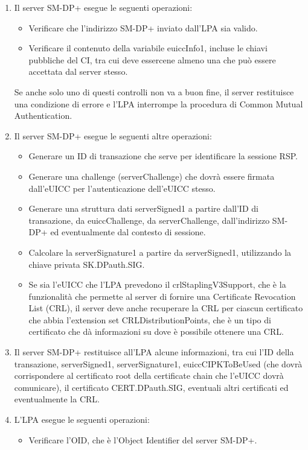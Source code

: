 \documentclass[10pt, twoside, openany]{book}
\begin{document}
\begin{enumerate}
\item Il server SM-DP+ esegue le seguenti operazioni:
\begin{itemize}[itemsep=0pt]
\item Verificare che l'indirizzo SM-DP+ inviato dall'LPA sia valido.
\item Verificare il contenuto della variabile euiccInfo1, incluse le chiavi pubbliche del CI, tra cui deve essercene almeno una che può essere accettata dal server stesso.
\end{itemize}
Se anche solo uno di questi controlli non va a buon fine, il server restituisce una condizione di errore e l'LPA interrompe la procedura di Common Mutual Authentication.
\item Il server SM-DP+ esegue le seguenti altre operazioni:
\begin{itemize}[itemsep=0pt]
\item Generare un ID di transazione che serve per identificare la sessione RSP.
\item Generare una challenge (serverChallenge) che dovrà essere firmata dall'eUICC per l'autenticazione dell'eUICC stesso.
\item Generare una struttura dati serverSigned1 a partire dall'ID di transazione, da euiccChallenge, da serverChallenge, dall'indirizzo SM-DP+ ed eventualmente dal contesto di sessione.
\item Calcolare la serverSignature1 a partire da serverSigned1, utilizzando la chiave privata SK.DPauth.SIG.
\item Se sia l'eUICC che l'LPA prevedono il crlStaplingV3Support, che è la funzionalità che permette al server di fornire una Certificate Revocation List (CRL), il server deve anche recuperare la CRL per ciascun certificato che abbia l'extension set CRLDistributionPoints, che è un tipo di certificato che dà informazioni su dove è possibile ottenere una CRL.
\end{itemize}
\item Il server SM-DP+ restituisce all'LPA alcune informazioni, tra cui l'ID della transazione, serverSigned1, serverSignature1, euiccCIPKToBeUsed (che dovrà corrispondere al certificato root della certificate chain che l'eUICC dovrà comunicare), il certificato CERT.DPauth.SIG, eventuali altri certificati ed eventualmente la CRL.
\item L'LPA esegue le seguenti operazioni:
\begin{itemize}[itemsep=0pt]
\item Verificare l'OID, che è l'Object Identifier del server SM-DP+.

\end{itemize}
\end{enumerate}
\end{document}
